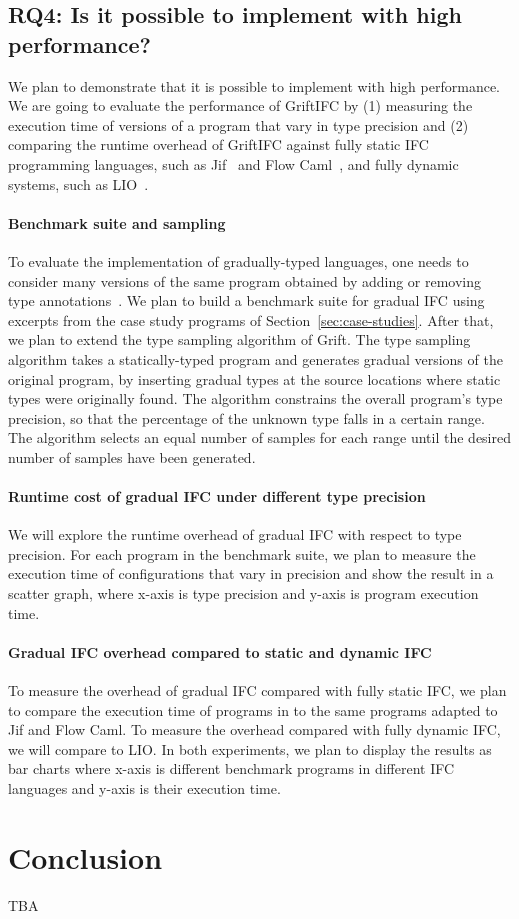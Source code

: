 \subsection{RQ4: Is it possible to implement \SurfacePlus with high
        performance?}

We plan to demonstrate that it is possible to implement \SurfacePlus with high
performance. We are going to evaluate the performance of GriftIFC by (1)
measuring the execution time of versions of a program that vary in type
precision and (2) comparing the runtime overhead of GriftIFC against fully
static IFC programming languages, such as Jif~\parencite{Myers:2006aa} and Flow
Caml~\parencite{simonet-flowcaml-manual}, and fully dynamic systems, such as
LIO~\parencite{STEFAN:2017ta}.

\paragraph{Benchmark suite and sampling} To evaluate the implementation of
gradually-typed languages, one needs to consider many versions of the same
program obtained by adding or removing type annotations~\parencite{Takikawa:2016aa}.
We plan to build a benchmark suite for gradual IFC using excerpts from the case
study programs of Section~\ref{sec:case-studies}.
After that, we plan to extend the type sampling algorithm of Grift. The type
sampling algorithm takes a statically-typed program and generates gradual
versions of the original program, by inserting gradual types at the source
locations where static types were originally found. The algorithm constrains the
overall program’s type precision, so that the percentage of the unknown type
falls in a certain range. The algorithm selects an equal number of samples for
each range until the desired number of samples have been generated.

\paragraph{Runtime cost of gradual IFC under different type precision}
We will explore the runtime overhead of gradual IFC with respect to type
precision. For each program in the benchmark suite, we plan to measure the
execution time of configurations that vary in precision and show the result in a
scatter graph, where x-axis is type precision and y-axis is program execution
time.

\paragraph{Gradual IFC overhead compared to static and dynamic IFC}
To measure the overhead of gradual IFC compared with fully static IFC, we plan
to compare the execution time of programs in \SurfacePlus to the same
programs adapted to Jif and Flow Caml. To measure the overhead compared with
fully dynamic IFC, we will compare \SurfacePlus to LIO. In both
experiments, we plan to display the results as bar charts where x-axis is
different benchmark programs in different IFC languages and y-axis is their
execution time.

\section{Conclusion}
\label{sec:conclusion}

TBA
